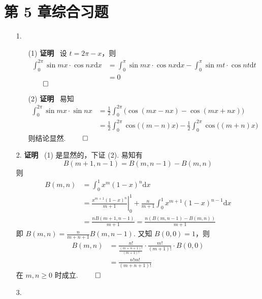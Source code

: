 \documentclass[11pt,oneside,fontset=fandol]{ctexbook} %
\begin{document}
\section*{第 5 章综合习题}

\begin{enumerate}
    \item[1.]
    \begin{enumerate}
        \item[(1)]
        \textbf{证明} \ 设 $t = 2 \pi - x$，则
        \begin{align*}
            \int_0^{2 \pi} \sin mx \cdot \cos nx \mathrm dx &= \int_0^\pi \sin mx \cdot \cos nx \mathrm dx - \int_0^\pi \sin mt \cdot \cos nt \mathrm dt \\
            &= 0
        \end{align*}
        $\hfill\qed$
        \item[(2)]
        \textbf{证明} \ 易知
        \begin{align*}
            \int_0^{2\pi} \sin mx \cdot \sin nx &= \frac 1 2 \int_0^{2\pi} \bigg( \cos( mx - nx ) - \cos( mx + nx ) \bigg) \\
            &= \frac 1 2 \int_0^{2\pi} \cos\big( (m - n)x \big) - \frac 1 2 \int_0^{2\pi} \cos\big( (m + n)x \big)
        \end{align*}
        则结论显然.
        $\hfill\qed$
    \end{enumerate}
    \item[2.]
    \textbf{证明} \ (1) 是显然的，下证 (2). 易知有
    \[
        B(m+1, n-1) = B(m, n-1) - B(m, n)
    \]
    则
    \begin{align*}
        B(m, n) &= \int_0^1 x^m (1-x)^n \mathrm dx \\
        &= \left. \frac{x^{m+1}(1-x)^n}{m+1} \right|_0^1 + \frac n {m+1} \int_0^1 x^{m+1} (1-x)^{n-1} \mathrm dx \\
        &= \frac{n B(m+1, n-1)}{m+1} = \frac{n (B(m, n-1) - B(m, n))}{m+1}
    \end{align*}
    即 $B(m, n) = \frac n {m+n+1} B(m, n-1)$. 又知 $B(0, 0) = 1$，则
    \begin{align*}
        B(m, n) &= \frac{n!}{\frac{(m+n+1)!}{(m+1)!}} \cdot \frac{m!}{(m+1)!} \cdot B(0, 0) \\
        &= \frac{n!m!}{(m+n+1)!}
    \end{align*}
    在 $m, n \geqslant 0$ 时成立.
    $\hfill\qed$
    \item[3.]
    \begin{enumerate}

\end{enumerate}
\end{enumerate}
\end{document}
